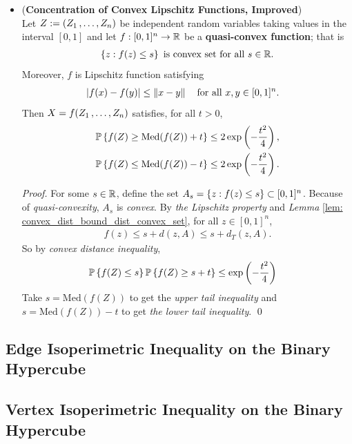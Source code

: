 \documentclass[11pt]{article}
\begin{document}
\begin{itemize}
\item \begin{theorem} (\textbf{Concentration of Convex Lipschitz Functions, Improved}) \citep{boucheron2013concentration}\\
Let  $Z:= (Z_1 \,{,}\ldots{,}\, Z_{n})$ be independent random variables taking values in the interval $[0, 1]$ and let $f : [0, 1]^n \to {\mathbb R}$ be a \textbf{quasi-convex function}; that is
\begin{align*}
\left\{z: f(z) \le s\right\} \text{ is convex set for all }s \in {\mathbb R}. 
\end{align*} Moreover, $f$ is Lipschitz function satisfying
\begin{align*}
\left\lvert f(x) - f(y) \right\rvert &\le \left\|x - y\right\|_{} \quad \text{for all }x, y \in [0, 1]^n.
\end{align*}
Then $X = f(Z_1 \,{,}\ldots{,}\, Z_{n})$ satisfies, for all $t > 0$,
\begin{align}
{\mathbb P}\left\{f(Z)  \ge  \text{Med}(f(Z)) + t \right\} &\le 2\exp\left(- \frac{t^2}{4}\right), \label{ineqn: convex_lipschitz_concentration_med} \\
{\mathbb P}\left\{f(Z)  \le \text{Med}(f(Z)) -t \right\} &\le 2\exp\left(- \frac{t^2}{4}\right). \nonumber
\end{align}
\end{theorem}
\begin{proof}
For some $s \in {\mathbb R}$, define the set $A_s = \left\{z : f(z) \le s\right\} \subset [0, 1]^n$.  Because of \emph{quasi-convexity}, $A_s$ is \emph{convex}.  By \emph{the Lipschitz property} and \emph{Lemma} \ref{lem: convex_dist_bound_dist_convex_set}, for all $z \in [0, 1]^n$,
\begin{align*}
f(z) \le s +  d(z, A) \le s + d_{T}(z, A).
\end{align*} So by \emph{convex distance inequality}, 
\begin{align*}
{\mathbb P}\left\{f(Z) \le s\right\} {\mathbb P}\left\{f(Z) \ge s + t\right\} &\le \exp\left(- \frac{t^2}{4}\right)
\end{align*} Take $s = \text{Med}(f(Z))$ to get the \emph{upper tail inequality} and $s = \text{Med}(f(Z)) - t$ to get \emph{the lower tail inequality}. \qed
\end{proof}
\end{itemize}

\subsection{Edge Isoperimetric Inequality on the Binary Hypercube}
\subsection{Vertex Isoperimetric Inequality on the Binary Hypercube}








\newpage


\end{document}
